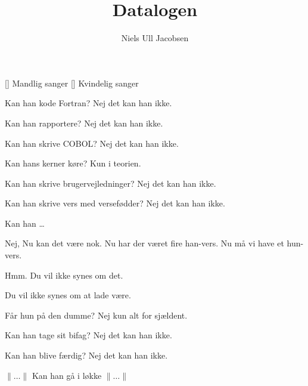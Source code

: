 \documentclass[a4paper,11pt]{article}
\title{Datalogen}
\author{Niels Ull Jacobsen}
\begin{document}
\maketitle

\begin{roles}
[] Mandlig sanger
[] Kvindelig sanger
\end{roles}

\begin{song}
Kan han kode Fortran?
Nej det kan han ikke.

Kan han rapportere?
Nej det kan han ikke.

Kan han skrive COBOL?
Nej det kan han ikke.

Kan hans kerner køre?
Kun i teorien.

Kan han skrive brugervejledninger?
Nej det kan han ikke.

Kan han skrive vers med versefødder?
Nej det kan han ikke.

 Kan han \dots

 Nej, Nu kan det være nok. Nu har der været fire han-vers.
Nu må vi have et hun-vers.


Hmm. Du vil ikke synes om det.


Du vil ikke synes om at lade være.

Får hun på den dumme?
Nej kun alt for sjældent.

Kan han tage sit bifag?
Nej det kan han ikke.

Kan han blive færdig?
Nej det kan han ikke.

$\parallel \dots \parallel$
Kan han gå i løkke
$\parallel \dots \parallel$\\

\end{song}
\end{document}
